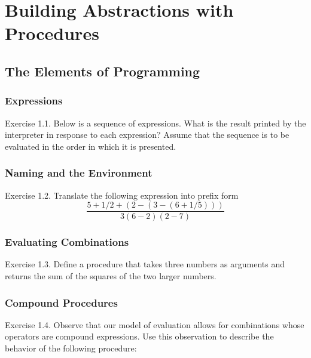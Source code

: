 %

    \section{Building Abstractions with Procedures}
        \subsection{The Elements of Programming}
            \subsubsection{Expressions}
Exercise 1.1. Below is a sequence of expressions. What is the result printed by the interpreter in response to each expression? Assume that the sequence is to be evaluated in the order in which it is presented.
\newline
            \subsubsection{Naming and the Environment}
Exercise 1.2. Translate the following expression into prefix form
\newline
\begin{equation}
\frac{5 + 1/2 + \left(2 - \left(3 - \left(6 + 1/5\right) \right) \right)}{3 \left( 6 - 2 \right) \left( 2 - 7 \right)}
\end{equation}
\newline
            \subsubsection{Evaluating Combinations}
Exercise 1.3. Define a procedure that takes three numbers as arguments and returns the sum of the squares of the two larger numbers.
\newline
            \subsubsection{Compound Procedures}
Exercise 1.4. Observe that our model of evaluation allows for combinations whose operators are compound expressions. Use this observation to describe the behavior of the following procedure:
\newline
{}
\newline
{}
\newline

